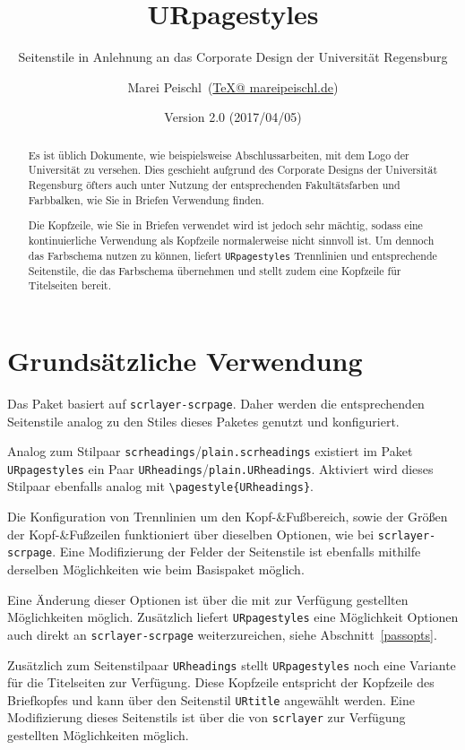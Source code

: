 \documentclass[english,headsepline=3pt,headinclude=true]{scrartcl}
\title{URpagestyles}
\subtitle{Seitenstile in Anlehnung an das Corporate Design der Universität Regensburg}
\date{Version 2.0 (2017/04/05)}
\author{Marei Peischl~(\href{mailto:TeX@mareipeischl.de}{TeX@ mareipeischl.de})}
\newcommand*{\pck}[1]{\texttt{#1}}
\newcommand*{\code}[1]{\texttt{#1}}
\begin{document}
\maketitle

\begin{abstract}
	\noindent Es ist üblich Dokumente, wie beispielsweise Abschlussarbeiten, mit dem Logo der Universität zu versehen. Dies geschieht aufgrund des Corporate Designs der Universität Regensburg öfters auch unter Nutzung der entsprechenden Fakultätsfarben und Farbbalken, wie Sie in Briefen Verwendung finden.
	
	Die Kopfzeile, wie Sie in Briefen verwendet wird ist jedoch sehr mächtig, sodass eine kontinuierliche Verwendung als Kopfzeile normalerweise nicht sinnvoll ist. Um dennoch das Farbschema nutzen zu können, liefert \pck{URpagestyles} Trennlinien und entsprechende Seitenstile, die das Farbschema übernehmen und stellt zudem eine Kopfzeile für Titelseiten bereit.
\end{abstract}

\section{Grundsätzliche Verwendung}
Das Paket basiert auf \pck{scrlayer-scrpage}. Daher werden die entsprechenden Seitenstile analog zu den Stiles dieses Paketes genutzt und konfiguriert.

Analog zum Stilpaar \code{scrheadings}/\code{plain.scrheadings} existiert im Paket \pck{URpagestyles} ein Paar \code{URheadings}/\code{plain.URheadings}. 
Aktiviert wird dieses Stilpaar ebenfalls analog mit \code{\textbackslash{}pagestyle\{URheadings\}}.

Die Konfiguration von Trennlinien um den Kopf-\&Fußbereich, sowie der Größen der Kopf-\&Fußzeilen funktioniert über dieselben Optionen, wie bei \pck{scrlayer-scrpage}. Eine Modifizierung der Felder der Seitenstile ist ebenfalls mithilfe derselben Möglichkeiten wie beim Basispaket möglich.

Eine Änderung dieser Optionen ist über die mit \KOMAScript{} zur Verfügung gestellten Möglichkeiten möglich.
Zusätzlich liefert \pck{URpagestyles} eine Möglichkeit Optionen auch direkt an \pck{scrlayer-scrpage} weiterzureichen, siehe 
Abschnitt~\ref{passopts}.

Zusätzlich zum Seitenstilpaar \code{URheadings} stellt  \pck{URpagestyles} noch eine Variante für die Titelseiten zur Verfügung. Diese Kopfzeile entspricht der Kopfzeile des Briefkopfes und kann über den Seitenstil \code{URtitle} angewählt werden. Eine Modifizierung dieses Seitenstils ist über die von \pck{scrlayer} zur Verfügung gestellten Möglichkeiten möglich.
\end{document}
